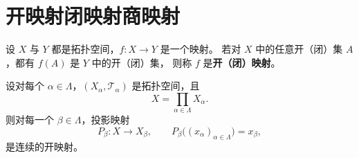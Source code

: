 \section{开映射闭映射商映射}
\begin{definition}[开（闭）映射——限制的是原像到像]
设 $X$ 与 $Y$ 都是拓扑空间，$f:X\to Y$ 是一个映射。  
若对 $X$ 中的任意开（闭）集 $A$，都有 $f(A)$ 是 $Y$ 中的开（闭）集，  
则称 $f$ 是\textbf{开（闭）映射}。
\end{definition}
\begin{theorem}[投影映射的连续性与开性]\label{thm:projection-open}
设对每个 $\alpha\in\Lambda$，$(X_\alpha,\mathcal{T}_\alpha)$ 是拓扑空间，且
\[
X=\prod_{\alpha\in\Lambda} X_\alpha.
\]
则对每一个 $\beta\in\Lambda$，投影映射
\[
P_\beta:X\to X_\beta,\qquad P_\beta\big((x_\alpha)_{\alpha\in\Lambda}\big)=x_\beta,
\]
是连续的开映射。
\end{theorem}

